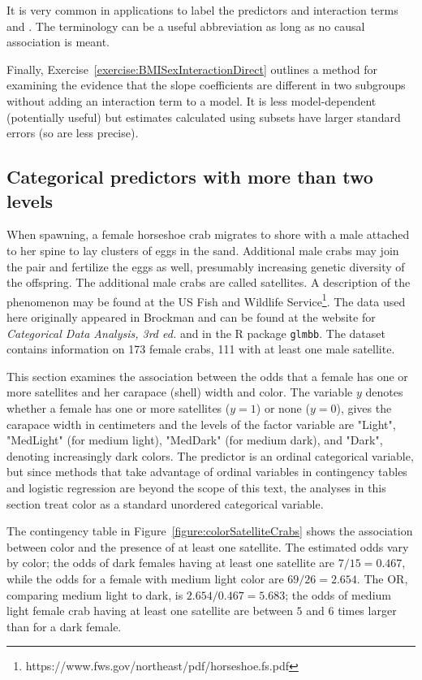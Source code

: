 It is very common in applications to label the predictors and interaction terms  and .  The terminology can be a useful abbreviation as long as no causal association is meant.

Finally, Exercise~\ref{exercise:BMISexInteractionDirect} outlines a method for examining the evidence that the slope coefficients are different in two subgroups without adding an interaction term to a model.  It is less model-dependent (potentially useful) but estimates calculated using subsets have larger standard errors (so are less precise).


\subsection{Categorical predictors with more than two levels}
\label{section:predictorsMoreThanTwoLevels}

When spawning, a female horseshoe crab migrates to shore with a male attached to her spine to lay clusters of eggs in the sand.  Additional male crabs may join the pair and fertilize the eggs as well, presumably increasing genetic diversity of the offspring. The additional male crabs are called satellites.  A description of the phenomenon may be found at the US Fish and Wildlife Service\footnote{https://www.fws.gov/northeast/pdf/horseshoe.fs.pdf}. The data used here originally appeared in Brockman  and can be found at the website for \textit{Categorical Data Analysis, 3rd ed.} and in the \textsf{R} package \texttt{glmbb}. The dataset contains information on 173 female crabs, 111 with at least one male satellite.

This section examines the association between the odds that a female has one or more satellites and her carapace (shell) width and color.   The variable $y$ denotes whether a female has one or more satellites ($y = 1$) or none ($y = 0$),  gives the carapace width in centimeters and the levels of the factor variable  are "Light", "MedLight" (for medium light), "MedDark" (for medium dark), and "Dark", denoting increasingly dark colors. The predictor  is an ordinal categorical variable, but since methods that take advantage of ordinal variables in contingency tables and logistic regression are beyond the scope of this text, the analyses in this section treat color as a standard unordered categorical variable.

The contingency table in Figure~\ref{figure:colorSatelliteCrabs} shows the association between color and the presence of at least one satellite.  The estimated odds vary by color; the odds of dark females having at least one satellite are $7/15 = 0.467$, while the odds for a female with medium light color are $69/26 = 2.654$. The OR, comparing medium light to dark, is $2.654/0.467 = 5.683$; the odds of medium light female crab having at least one satellite are between $5$ and $6$ times larger than for a dark female.

